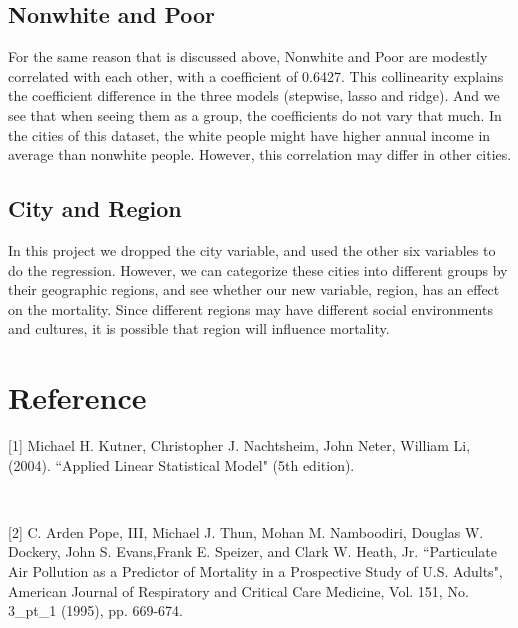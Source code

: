 \documentclass{article}
\begin{document}
  \subsection{Nonwhite and Poor}
     For the same reason that is discussed above, Nonwhite and Poor are modestly correlated with each other, with a coefficient of 0.6427. This collinearity explains the coefficient difference in the three models (stepwise, lasso and ridge). And we see that when seeing them as a group, the coefficients do not vary that much. In the cities of this dataset, the white people might have higher annual income in average than nonwhite people. However, this correlation may differ in other cities.

  \subsection{City and Region}
    In this project we dropped the city variable, and used the other six variables to do the regression. However, we can categorize these cities into different groups by their geographic regions, and see whether our new variable, region, has an effect on the mortality. Since different regions may have different social environments and cultures, it is possible that region will influence mortality.

\section*{Reference}

  [1] Michael H. Kutner, Christopher J. Nachtsheim, John Neter, William Li, (2004). ``Applied Linear Statistical Model" (5th edition).

  \

  [2] C. Arden Pope, III, Michael J. Thun, Mohan M. Namboodiri, Douglas W. Dockery, John S. Evans,Frank E. Speizer, and Clark W. Heath, Jr. ``Particulate Air Pollution as a Predictor of Mortality in a Prospective Study of U.S. Adults", American Journal of Respiratory and Critical Care Medicine, Vol. 151, No. 3\_pt\_1 (1995), pp. 669-674.




\end{document}

